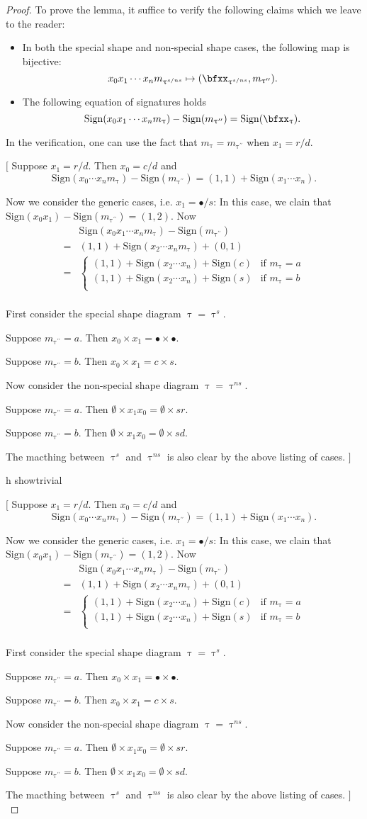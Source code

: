 \documentclass[12pt,a4paper]{amsart}
\newcommand{\trivial}[2][]{\if\relax\detokenize{#1}\relax
  {%
      \color{orange} \vspace{0em} $[$  #2 $]$
      \color{black}
  }
  \else
\ifx#1h
\ifcsname showtrivial\endcsname
{%
    \color{orange} \vspace{0em}  $[$ #2 $]$
    \color{black}
}
\fi
\else {\red Wrong argument!} \fi
\fi
}
\numberwithin{equation}{section}
\theoremstyle{remark}
\def\ssign{\mathrm{Sign}}
\def\uptaupp{\uptau^{\prime\prime}}
\begin{document}
\begin{proof}
     To prove the lemma, it suffice to verify the following claims which we leave to the reader:
     \begin{itemize}
       \item In both the special shape and non-special shape cases, the
       following map is bijective:
       \[
       x_{0}x_{1}\cdots x_{n}m_{\uptau^{s/ns}}\mapsto (\bfxx_{\uptau^{s/ns}},m_{\uptaupp}).
       \]
       \item The following equation of signatures holds
       \[
         \ssign( x_{0}x_{1}\cdots x_{n}m_{\uptau} ) - \ssign(m_{\uptaupp})  =\ssign(\bfxx_{\uptau}).
       \]
     \end{itemize}
     In the verification, one can use the fact that $m_{\uptau}=m_{\uptaupp}$
     when $x_{1} = r/d$.

     \trivial[]{
       Suppose $x_{1}=r/d$. Then $x_{0} = c/d$ and
       \[\ssign(x_{0}\cdots x_{n}m_{\uptau})-\ssign(m_{\uptaupp}) = (1,1)+\ssign(x_{1}\cdots x_{n}).\]

       Now we consider the generic cases, i.e. $x_{1}=\bullet/s$:
       In this case, we clain that $\ssign(x_{0}x_{1}) - \ssign(m_{\uptaupp}) = (1,2)$.
       Now
       \[
         \begin{split}
           & \ssign(x_{0}x_{1}\cdots x_{n}m_{\uptau})-\ssign(m_{\uptaupp}) \\
           =& (1,1)+\ssign(x_{2}\cdots x_{n}m_{\uptau}) +(0,1) \\
           = &\begin{cases} (1,1) +\ssign(x_{2}\cdots x_{n}) + \ssign(c)
             & \text{if } m_{\uptau} = a\\
             (1,1) +\ssign(x_{2}\cdots x_{n}) + \ssign(s) & \text{if } m_{\uptau} = b\\
           \end{cases}\\
         \end{split}
       \]

       First consider the special shape diagram $\uptau=\uptau^{s}$.
       \begin{enumPF}
         \item Suppose $m_{\uptaupp}=a$. Then $x_{0}\times x_{1}=\bullet\times \bullet$.
           \item Suppose $m_{\uptaupp}= b$. Then $x_{0}\times x_{1}=c\times s$.
       \end{enumPF}
       Now consider the non-special shape diagram $\uptau=\uptau^{ns}$.
       \begin{enumPF}
         \item Suppose $m_{\uptaupp}=a$. Then
         $\emptyset \times x_{1}x_{0}=\emptyset \times sr$.
         \item Suppose $m_{\uptaupp}= b$. Then
         $\emptyset \times x_{1}x_{0}=\emptyset \times sd$.
       \end{enumPF}
       The macthing between $\uptau^{s}$ and $\uptau^{ns}$ is also clear by the
       above listing of cases.
     }
 \end{proof}
\end{document}
